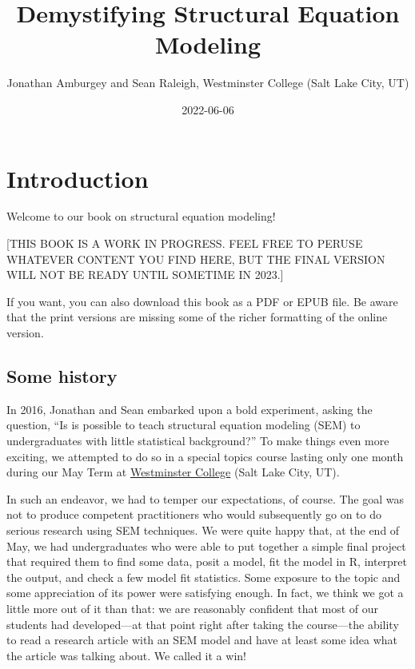 \documentclass[
]{book}
\title{Demystifying Structural Equation Modeling}
\author{Jonathan Amburgey and Sean Raleigh, Westminster College (Salt Lake City, UT)}
\date{2022-06-06}
\begin{document}
\maketitle

{
\setcounter{tocdepth}{1}
\tableofcontents
}
\hypertarget{intro}{%
\chapter*{Introduction}\label{intro}}

Welcome to our book on structural equation modeling!

{[}THIS BOOK IS A WORK IN PROGRESS. FEEL FREE TO PERUSE WHATEVER CONTENT YOU FIND HERE, BUT THE FINAL VERSION WILL NOT BE READY UNTIL SOMETIME IN 2023.{]}

If you want, you can also download this book as a PDF or EPUB file. Be aware that the print versions are missing some of the richer formatting of the online version.

\hypertarget{intro-history}{%
\section*{Some history}\label{intro-history}}

In 2016, Jonathan and Sean embarked upon a bold experiment, asking the question, ``Is is possible to teach structural equation modeling (SEM) to undergraduates with little statistical background?'' To make things even more exciting, we attempted to do so in a special topics course lasting only one month during our May Term at \href{https://westminstercollege.edu/}{Westminster College} (Salt Lake City, UT).

In such an endeavor, we had to temper our expectations, of course. The goal was not to produce competent practitioners who would subsequently go on to do serious research using SEM techniques. We were quite happy that, at the end of May, we had undergraduates who were able to put together a simple final project that required them to find some data, posit a model, fit the model in R, interpret the output, and check a few model fit statistics. Some exposure to the topic and some appreciation of its power were satisfying enough. In fact, we think we got a little more out of it than that: we are reasonably confident that most of our students had developed---at that point right after taking the course---the ability to read a research article with an SEM model and have at least some idea what the article was talking about. We called it a win!
\end{document}
